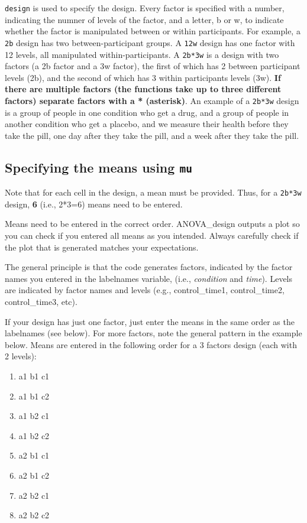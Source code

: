\documentclass[]{book}
\providecommand{\tightlist}{%
  \setlength{\itemsep}{0pt}\setlength{\parskip}{0pt}}
\begin{document}
\texttt{design} is used to specify the design.
Every factor is specified with a number, indicating the numner of levels of the factor, and a letter, b or w, to indicate whether the factor is manipulated between or within participants.
For example, a \texttt{2b} design has two between-participant groups.
A \texttt{12w} design has one factor with 12 levels, all manipulated within-participants.
A \texttt{2b*3w} is a design with two factors (a 2b factor and a 3w factor), the first of which has 2 between participant levels (2b), and the second of which has 3 within participants levels (3w).
\textbf{If there are multiple factors (the functions take up to three different factors) separate factors with a * (asterisk)}.
An example of a \texttt{2b*3w} design is a group of people in one condition who get a drug, and a group of people in another condition who get a placebo, and we measure their health before they take the pill, one day after they take the pill, and a week after they take the pill.

\hypertarget{specifying-the-means-using-mu}{%
\subsection{\texorpdfstring{Specifying the means using \texttt{mu}}{Specifying the means using mu}}\label{specifying-the-means-using-mu}}

Note that for each cell in the design, a mean must be provided. Thus, for a \texttt{2b*3w} design, \textbf{6} (i.e., 2*3=6) means need to be entered.

Means need to be entered in the correct order. ANOVA\_design outputs a plot so you can check if you entered all means as you intended. Always carefully check if the plot that is generated matches your expectations.

The general principle is that the code generates factors, indicated by the factor names you entered in the labelnames variable, (i.e., \emph{condition} and \emph{time}). Levels are indicated by factor names and levels (e.g., control\_time1, control\_time2, control\_time3, etc).

If your design has just one factor, just enter the means in the same order as the labelnames (see below). For more factors, note the general pattern in the example below. Means are entered in the following order for a 3 factors design (each with 2 levels):

\begin{enumerate}
\def\labelenumi{\arabic{enumi}.}
\tightlist
\item
  a1 b1 c1
\item
  a1 b1 c2
\item
  a1 b2 c1
\item
  a1 b2 c2
\item
  a2 b1 c1
\item
  a2 b1 c2
\item
  a2 b2 c1
\item
  a2 b2 c2
\end{enumerate}
\end{document}
